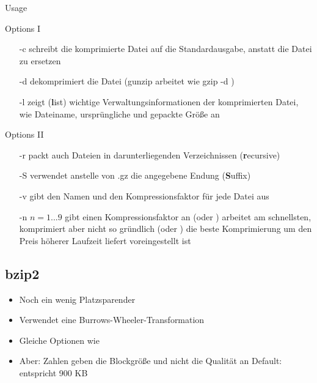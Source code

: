 \documentclass[aspectratio=43]{beamer}
\begin{document}
\begin{frame} 
	\begin{exampleblock}{Usage}
	\end{exampleblock}

	\begin{exampleblock}{Options I}
	\begin{itemize}
	\item[-c] schreibt die komprimierte Datei auf die Standardausgabe, anstatt die Datei zu ersetzen
	\item[-d] dekomprimiert die Datei (gunzip arbeitet wie gzip -d )
	\item[-l] zeigt (\textbf{l}ist) wichtige Verwaltungsinformationen der komprimierten Datei, wie Dateiname, ursprüngliche und gepackte Größe an

	\end{itemize}
	\end{exampleblock}
\end{frame}

\begin{frame} 
	\begin{exampleblock}{Options II}
	\begin{itemize}
	\item[-r] packt auch Dateien in darunterliegenden Verzeichnissen (\textbf{r}ecursive)
	\item[-S] verwendet anstelle von .gz die angegebene Endung (\textbf{S}uffix)
	\item[-v] gibt den Namen und den Kompressionsfaktor für jede Datei aus 
	\item[-n] $n= 1...9$ gibt einen Kompressionsfaktor an
	\newline {} (oder  ) arbeitet am schnellsten, komprimiert aber nicht so gründlich
	\newline {} (oder ) die beste Komprimierung um den Preis höherer Laufzeit liefert
	\newline voreingestellt ist 
	\end{itemize}
	\end{exampleblock}

	
\end{frame}


\subsection{bzip2}
\begin{frame} 
	\begin{block}{} 
	\begin{itemize}
	\item Noch ein wenig Platzsparender
	\item Verwendet eine Burrows-Wheeler-Transformation
	\item Gleiche Optionen wie 
	\item Aber: Zahlen geben die Blockgröße und nicht die Qualität an 
	\newline Default:  entspricht 900 KB 
	\end{itemize}
	\end{block}
\end{frame}
\end{document}
